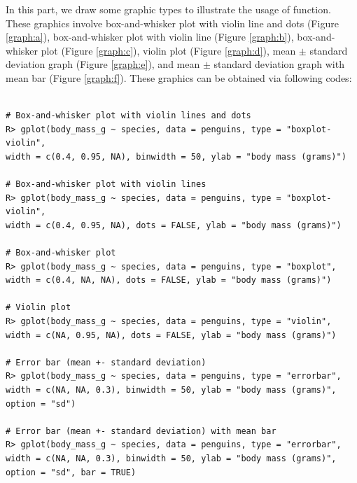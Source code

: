 In this part, we draw some graphic types to illustrate the usage of  function. These graphics involve box-and-whisker plot with violin line and dots (Figure \ref{graph:a}), box-and-whisker plot with violin line (Figure \ref{graph:b}), box-and-whisker plot (Figure \ref{graph:c}), violin plot (Figure \ref{graph:d}), mean $ \pm $ standard deviation graph (Figure \ref{graph:e}), and mean $ \pm $ standard deviation graph with mean bar (Figure \ref{graph:f}). These graphics can be obtained via following codes:

\begin{verbatim}

# Box-and-whisker plot with violin lines and dots
R> gplot(body_mass_g ~ species, data = penguins, type = "boxplot-violin", 
width = c(0.4, 0.95, NA), binwidth = 50, ylab = "body mass (grams)")

# Box-and-whisker plot with violin lines
R> gplot(body_mass_g ~ species, data = penguins, type = "boxplot-violin", 
width = c(0.4, 0.95, NA), dots = FALSE, ylab = "body mass (grams)")

# Box-and-whisker plot
R> gplot(body_mass_g ~ species, data = penguins, type = "boxplot", 
width = c(0.4, NA, NA), dots = FALSE, ylab = "body mass (grams)")

# Violin plot
R> gplot(body_mass_g ~ species, data = penguins, type = "violin",
width = c(NA, 0.95, NA), dots = FALSE, ylab = "body mass (grams)")

# Error bar (mean +- standard deviation)
R> gplot(body_mass_g ~ species, data = penguins, type = "errorbar", 
width = c(NA, NA, 0.3), binwidth = 50, ylab = "body mass (grams)", 
option = "sd")

# Error bar (mean +- standard deviation) with mean bar
R> gplot(body_mass_g ~ species, data = penguins, type = "errorbar",
width = c(NA, NA, 0.3), binwidth = 50, ylab = "body mass (grams)", 
option = "sd", bar = TRUE)

\end{verbatim}



